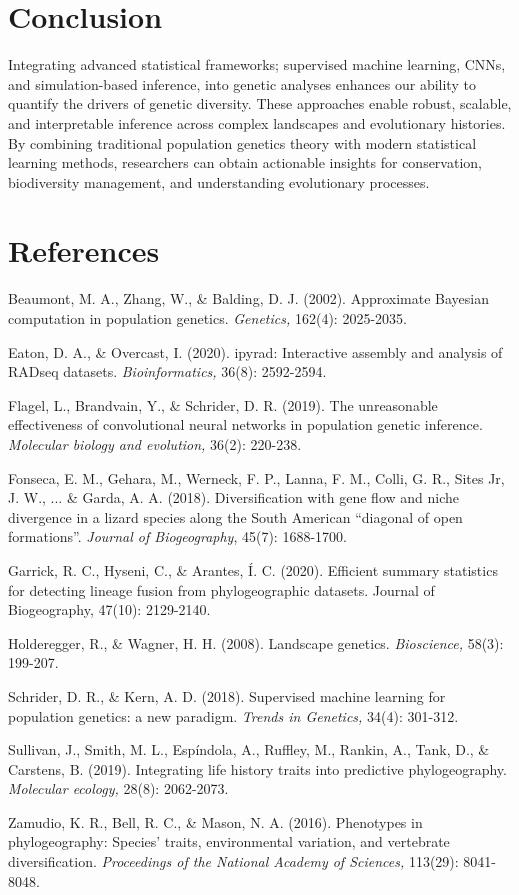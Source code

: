 \documentclass[
]{article}
\begin{document}
\hypertarget{conclusion}{%
\section{Conclusion}\label{conclusion}}

Integrating advanced statistical frameworks; supervised machine
learning, CNNs, and simulation-based inference, into genetic analyses
enhances our ability to quantify the drivers of genetic diversity. These
approaches enable robust, scalable, and interpretable inference across
complex landscapes and evolutionary histories. By combining traditional
population genetics theory with modern statistical learning methods,
researchers can obtain actionable insights for conservation,
biodiversity management, and understanding evolutionary processes.

\hypertarget{references}{%
\section{References}\label{references}}

Beaumont, M. A., Zhang, W., \& Balding, D. J. (2002). Approximate
Bayesian computation in population genetics. \emph{Genetics,} 162(4):
2025-2035.

Eaton, D. A., \& Overcast, I. (2020). ipyrad: Interactive assembly and
analysis of RADseq datasets. \emph{Bioinformatics,} 36(8): 2592-2594.

Flagel, L., Brandvain, Y., \& Schrider, D. R. (2019). The unreasonable
effectiveness of convolutional neural networks in population genetic
inference. \emph{Molecular biology and evolution,} 36(2): 220-238.

Fonseca, E. M., Gehara, M., Werneck, F. P., Lanna, F. M., Colli, G. R.,
Sites Jr, J. W., ... \& Garda, A. A. (2018). Diversification with gene
flow and niche divergence in a lizard species along the South American
``diagonal of open formations''. \emph{Journal of Biogeography}, 45(7):
1688-1700.

Garrick, R. C., Hyseni, C., \& Arantes, Í. C. (2020). Efficient summary
statistics for detecting lineage fusion from phylogeographic datasets.
Journal of Biogeography, 47(10): 2129-2140.

Holderegger, R., \& Wagner, H. H. (2008). Landscape genetics.
\emph{Bioscience,} 58(3): 199-207.

Schrider, D. R., \& Kern, A. D. (2018). Supervised machine learning for
population genetics: a new paradigm. \emph{Trends in Genetics,} 34(4):
301-312.

Sullivan, J., Smith, M. L., Espíndola, A., Ruffley, M., Rankin, A.,
Tank, D., \& Carstens, B. (2019). Integrating life history traits into
predictive phylogeography. \emph{Molecular ecology,} 28(8): 2062-2073.

Zamudio, K. R., Bell, R. C., \& Mason, N. A. (2016). Phenotypes in
phylogeography: Species' traits, environmental variation, and vertebrate
diversification. \emph{Proceedings of the National Academy of Sciences,}
113(29): 8041-8048.
\end{document}
